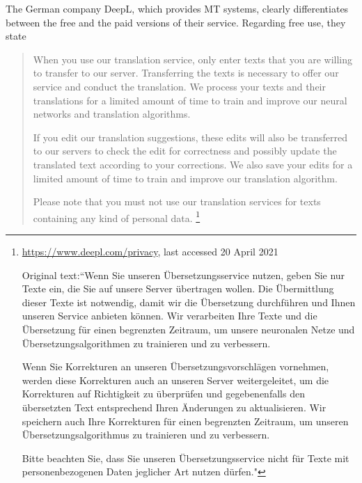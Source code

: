The German company DeepL, which provides MT systems, clearly differentiates between the free and the paid versions of their service. Regarding free use, they state
\begin{quote}
    When you use our translation service, only enter texts that you are willing to transfer to our server. Transferring the texts is necessary to offer our service and conduct the translation. We process your texts and their translations for a limited amount of time to train and improve our neural networks and translation algorithms.
    
    If you edit our translation suggestions, these edits will also be transferred to our servers to check the edit for correctness and possibly update the translated text according to your corrections. We also save your edits for a limited amount of time to train and improve our translation algorithm.
    
    Please note that you must not use our translation services for texts containing any kind of personal data.
    \footnote{\url{https://www.deepl.com/privacy}, last accessed 20 April 2021

    Original text:``Wenn Sie unseren Übersetzungsservice nutzen, geben Sie nur Texte ein, die Sie auf unsere Server übertragen wollen. Die Übermittlung dieser Texte ist notwendig, damit wir die Übersetzung durchführen und Ihnen unseren Service anbieten können. Wir verarbeiten Ihre Texte und die Übersetzung für einen begrenzten Zeitraum, um unsere neuronalen Netze und Übersetzungsalgorithmen zu trainieren und zu verbessern.

    Wenn Sie Korrekturen an unseren Übersetzungsvorschlägen vornehmen, werden diese Korrekturen auch an unseren Server weitergeleitet, um die Korrekturen auf Richtigkeit zu überprüfen und gegebenenfalls den übersetzten Text entsprechend Ihren Änderungen zu aktualisieren. Wir speichern auch Ihre Korrekturen für einen begrenzten Zeitraum, um unseren Übersetzungsalgorithmus zu trainieren und zu verbessern.

    Bitte beachten Sie, dass Sie unseren Übersetzungsservice nicht für Texte mit personenbezogenen Daten jeglicher Art nutzen dürfen."}
\end{quote}


